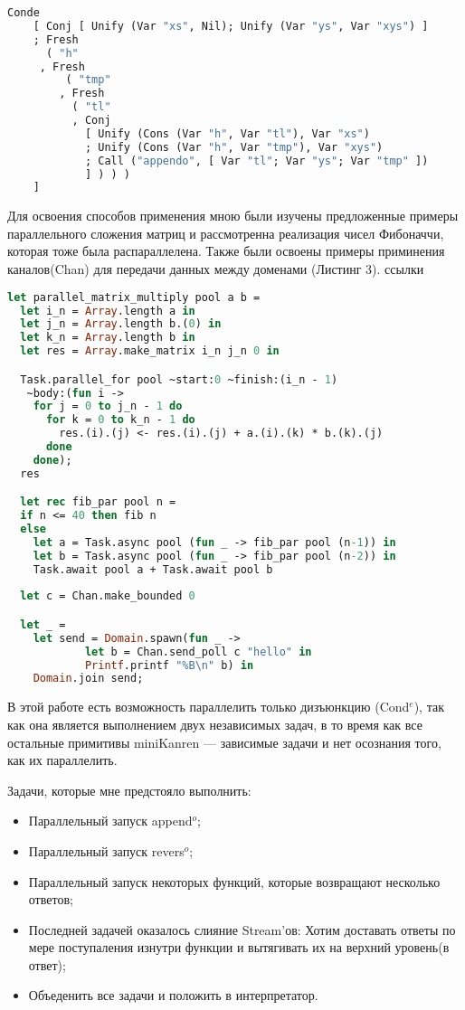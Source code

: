 \begin{lstlisting}[caption=\textbf{Append$^o$ на синтаксисе Unicanren (конкатенация двух списков)}, language=OCaml, frame=single]
  Conde
    [ Conj [ Unify (Var "xs", Nil); Unify (Var "ys", Var "xys") ]
    ; Fresh
      ( "h"
     , Fresh
         ( "tmp"
        , Fresh
          ( "tl"
          , Conj
            [ Unify (Cons (Var "h", Var "tl"), Var "xs")
            ; Unify (Cons (Var "h", Var "tmp"), Var "xys")
            ; Call ("appendo", [ Var "tl"; Var "ys"; Var "tmp" ])
            ] ) ) )
    ]
\end{lstlisting}

Для освоения способов применения мною были изучены предложенные примеры параллельного сложения матриц
и рассмотренна реализация чисел Фибоначчи, которая тоже была распараллелена. Также были освоены примеры приминения каналов(Chan) 
для передачи данных между доменами (Листинг 3).
ссылки

\begin{lstlisting}[caption=\textbf{Применение Domainslib 
  для сложения матриц, 
  чисел Фибоначчи и каналов}, language=OCaml, frame=single]
  let parallel_matrix_multiply pool a b =
  let i_n = Array.length a in
  let j_n = Array.length b.(0) in
  let k_n = Array.length b in
  let res = Array.make_matrix i_n j_n 0 in

  Task.parallel_for pool ~start:0 ~finish:(i_n - 1)
   ~body:(fun i ->
    for j = 0 to j_n - 1 do
      for k = 0 to k_n - 1 do
        res.(i).(j) <- res.(i).(j) + a.(i).(k) * b.(k).(j)
      done
    done);
  res

  let rec fib_par pool n =
  if n <= 40 then fib n
  else
    let a = Task.async pool (fun _ -> fib_par pool (n-1)) in
    let b = Task.async pool (fun _ -> fib_par pool (n-2)) in
    Task.await pool a + Task.await pool b
  
  let c = Chan.make_bounded 0

  let _ =
    let send = Domain.spawn(fun _ ->
            let b = Chan.send_poll c "hello" in
            Printf.printf "%B\n" b) in
    Domain.join send;
\end{lstlisting}

В этой работе есть возможность параллелить только дизъюнкцию (Cond$^e$), так как она является выполнением двух независимых задач,
в то время как все остальные примитивы miniKanren --- зависимые задачи и нет осознания того, как их параллелить.

Задачи, которые мне предстояло выполнить:
\begin{itemize}
  \item Параллельный запуск append$^o$;
\item Параллельный запуск revers$^o$;
\item Параллельный запуск некоторых функций, которые возвращают
несколько ответов;
\item Последней задачей оказалось слияние Stream’ов: Хотим доставать
ответы по мере поступаления изнутри функции и вытягивать их на
верхний уровень(в ответ);
\item Объеденить все задачи и положить в интерпретатор.
\end{itemize}

